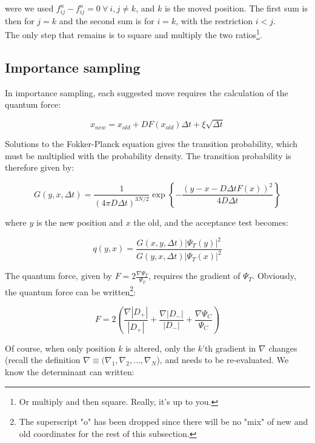 \documentclass[english, a4paper]{article}
\begin{document}
	were we used $f_{ij}^n-f_{ij}^o=0\:\forall\:i,j\neq k$, and $k$ is the moved position. The first sum is then for $j=k$ and the second sum is for $i=k$, with the restriction $i<j$.\\
	The only step that remains is to square and multiply the two ratios\footnote{Or multiply and then square. Really, it's up to you.}.
	
	\subsection{Importance sampling}
	In importance sampling, each suggested move requires the calculation of the quantum force:
	
	\begin{equation}
	x_{new} = x_{old} + DF(x_{old})\Delta t + \xi\sqrt{\Delta t}
	\end{equation}
	
	Solutions to the Fokker-Planck equation gives the transition probability, which must be multiplied with the probability density. The transition probability is therefore given by:
	
	\begin{equation}
	G(y,x,\Delta t) = \frac{1}{(4\pi D\Delta t)^{3N/2}}\exp\left\{ -\frac{(y-x-D\Delta tF(x))^2}{4D\Delta t} \right\}
	\end{equation}
	
	where $y$ is the new position and $x$ the old, and the acceptance test becomes:
	
	\begin{equation}
	q(y,x) = \frac{G(x,y,\Delta t)|\Psi_T(y)|^2}{G(y,x,\Delta t)|\Psi_T(x)|^2}
	\end{equation}
	
	The quantum force, given by $F = 2\frac{\nabla \Psi_T}{\Psi_T}$, requires the gradient of $\Psi_T$. Obviously, the quantum force can be written\footnote{The superscript "o" has been dropped since there will be no "mix" of new and old coordinates for the rest of this subsection.}:
	
	\begin{equation}
	F = 2\left(\frac{\nabla |D_+|}{|D_+|} + \frac{\nabla |D_-|}{|D_-|} + \frac{\nabla \Psi_C}{\Psi_C}\right)
	\end{equation}
	
	Of course, when only position $k$ is altered, only the $k$'th gradient in $\nabla$ changes (recall the definition $\nabla \equiv (\nabla_1, \nabla_2, \ldots, \nabla_N$), and needs to be re-evaluated. We know the determinant can written:
	
\end{document}
